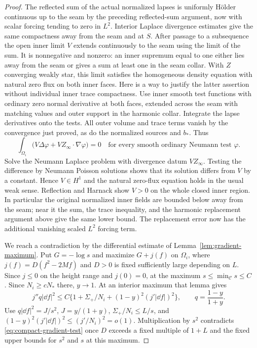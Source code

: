 \begin{proof}
The reflected sum of the actual normalized lapses is uniformly
H\"older continuous up to the seam by the preceding reflected-sum
argument, now with scalar forcing tending to zero in $L^2$.
Interior Laplace divergence estimates give the same compactness away
from the seam and at $S$. After passage to a subsequence the open
inner limit $V$ extends continuously to the seam using the limit of
the sum. It is nonnegative and nonzero: an inner supremum equal to one
either lies away from the seam or gives a sum at least one in the
seam collar. With $Z$ converging weakly star, this limit satisfies the
homogeneous density equation with natural zero flux on both inner
faces. Here is a way to justify the latter assertion without individual
inner trace compactness. Use inner smooth test functions with ordinary
zero normal derivative at both faces, extended across the seam with
matching values and outer support in the harmonic collar. Integrate
the lapse derivatives onto the tests. All outer volume and trace
terms vanish by the convergence just proved, as do the normalized
sources and $b_*$. Thus
\[
 \int_{\Omega_i}\bigl(V\Delta\varphi+VZ_\infty\cdot\nabla\varphi\bigr)=0
 \quad\text{for every smooth ordinary Neumann test }\varphi.
\]
Solve the Neumann Laplace problem with divergence datum $VZ_\infty$.
Testing the difference by Neumann Poisson solutions shows that its
solution differs from $V$ by a constant. Hence $V\in H^1$ and the
natural zero-flux equation holds in the usual weak sense. Reflection
and Harnack show $V>0$ on the whole closed inner region. In particular
the original normalized inner fields are bounded below away from the
seam; near it the sum, the trace inequality, and the harmonic
replacement argument above give the same lower bound. The replacement
error now has the additional vanishing scaled $L^2$ forcing term.

We reach a contradiction by the differential estimate of
Lemma~\ref{lem:gradient-maximum}. Put $G=-\log s$ and maximize
$G+j(f)$ on $\Omega_i$, where
$j(f)=D(f^2-2Mf)$ and $D>0$ is fixed sufficiently large depending on
$L$. Since $j\le0$ on the height range and $j(0)=0$,
at the maximum $s\le\min_{\mathcal C}s\le C$. Since
$N_i\ge cN_*$ there, $y\to1$. At an interior maximum that lemma gives
\begin{equation}\label{eq:compact-gradient-test}
 j''q|\dd f|^2\le C\{1+\Sigma_+/N_i+
                    (1-y)^2(j'|\dd f|)^2\},\qquad
 q=\frac{1-y}{1+y}.
\end{equation}
Use $q|\dd f|^2=J/s^2$, $J=y/(1+y)$,
$\Sigma_+/N_i\le L/s$, and
$(1-y)^2(j'|\dd f|)^2\le(j'/N_i)^2=o(1)$.
Multiplication by $s^2$ contradicts \eqref{eq:compact-gradient-test}
once $D$ exceeds a fixed multiple of $1+L$ and the fixed upper bounds
for $s^2$ and $s$ at this maximum.


\end{proof}
